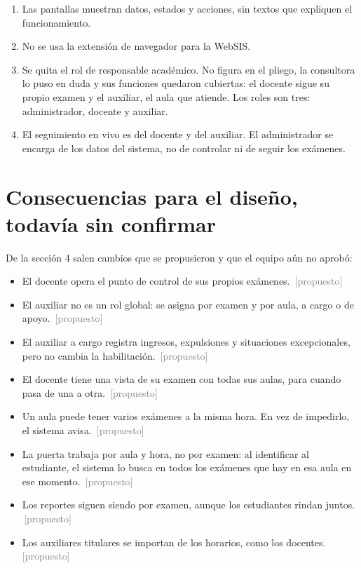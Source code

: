 \documentclass[11pt,letterpaper]{article}
\newcommand{\propuesto}{\textcolor{gray}{\footnotesize\,[propuesto]}}
\begin{document}
\begin{enumerate}
        asignaturas.
  \item Las pantallas muestran datos, estados y acciones, sin textos que expliquen el
        funcionamiento.
  \item No se usa la extensión de navegador para la WebSIS.
  \item Se quita el rol de responsable académico. No figura en el pliego, la consultora
        lo puso en duda y sus funciones quedaron cubiertas: el docente sigue su propio
        examen y el auxiliar, el aula que atiende. Los roles son tres: administrador,
        docente y auxiliar.
  \item El seguimiento en vivo es del docente y del auxiliar. El administrador se
        encarga de los datos del sistema, no de controlar ni de seguir los exámenes.
\end{enumerate}

\section{Consecuencias para el diseño, todavía sin confirmar}

De la sección 4 salen cambios que se propusieron y que el equipo aún no aprobó:

\begin{itemize}
  \item El docente opera el punto de control de sus propios exámenes. \propuesto
  \item El auxiliar no es un rol global: se asigna por examen y por aula, a cargo o de
        apoyo. \propuesto
  \item El auxiliar a cargo registra ingresos, expulsiones y situaciones excepcionales,
        pero no cambia la habilitación. \propuesto
  \item El docente tiene una vista de su examen con todas sus aulas, para cuando pasa de
        una a otra. \propuesto
  \item Un aula puede tener varios exámenes a la misma hora. En vez de impedirlo, el
        sistema avisa. \propuesto
  \item La puerta trabaja por aula y hora, no por examen: al identificar al estudiante,
        el sistema lo busca en todos los exámenes que hay en esa aula en ese momento.
        \propuesto
  \item Los reportes siguen siendo por examen, aunque los estudiantes rindan juntos.
        \propuesto
  \item Los auxiliares titulares se importan de los horarios, como los docentes.
        \propuesto
\end{itemize}
\end{document}
